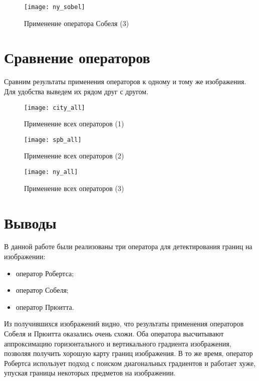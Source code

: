 \begin{figure}[H]
	\centering
	\texttt{[image: ny\_sobel]}
	\caption{Применение оператора Собеля (3)}
\end{figure}

\newpage

\section{Сравнение операторов}

Сравним результаты применения операторов к одному и тому же изображения. Для удобства выведем их рядом друг с другом.

\begin{figure}[H]
	\centering
	\texttt{[image: city\_all]}
	\caption{Применение всех операторов (1)}
\end{figure}

\begin{figure}[H]
	\centering
	\texttt{[image: spb\_all]}
	\caption{Применение всех операторов (2)}
\end{figure}

\begin{figure}[H]
	\centering
	\texttt{[image: ny\_all]}
	\caption{Применение всех операторов (3)}
\end{figure}

\section{Выводы}

В данной работе были реализованы три оператора для детектирования границ на изображении:

\begin{itemize}
	\item оператор Робертса;
	\item оператор Собеля;
	\item оператор Прюитта.
\end{itemize}

Из получившихся изображений видно, что результаты применения операторов Собеля и Прюитта оказались очень схожи. Оба оператора высчитывают аппроксимацию горизонтального и вертикального градиента изображения, позволяя получить хорошую карту границ изображения. В то же время, оператор Робертса использует подход с поиском диагональных градиентов и работает хуже, упуская границы некоторых предметов на изображении.


